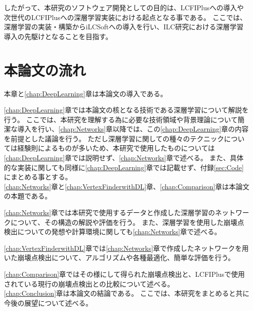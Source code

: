 したがって、本研究のソフトウェア開発としての目的は、LCFIPlusへの導入や次世代のLCFIPlusへの深層学習実装における起点となる事である。
ここでは、深層学習の実装・構築からiLCSoftへの導入を行い、ILC研究における深層学習導入の先駆けとなることを目指す。


\section{本論文の流れ} \label{Intro:Flow}

本章と\ref{chap:DeepLearning}章は本論文の導入である。

\ref{chap:DeepLearning}章では本論文の核となる技術である深層学習について解説を行う。
ここでは、本研究を理解する為に必要な技術領域や背景理論について簡潔な導入を行い、\ref{chap:Networks}章以降では、この\ref{chap:DeepLearning}章の内容を前提とした議論を行う。
ただし深層学習に関しての種々のテクニックについては経験則によるものが多いため、本研究で使用したものについては\ref{chap:DeepLearning}章では説明せず、\ref{chap:Networks}章で述べる。
また、具体的な実装に関しても同様に\ref{chap:DeepLearning}章では記載せず、付録\ref{sec:Code}にまとめる事とする。\\

\ref{chap:Networks}章と\ref{chap:VertexFinderwithDL}章、\ref{chap:Comparison}章は本論文の本題である。

\ref{chap:Networks}章では本研究で使用するデータと作成した深層学習のネットワークについて、その構造の解説や評価を行う。
また、深層学習を使用した崩壊点検出についての発想や計算環境に関しても\ref{chap:Networks}章で述べる。

\ref{chap:VertexFinderwithDL}章では\ref{chap:Networks}章で作成したネットワークを用いた崩壊点検出について、アルゴリズムや各種最適化、簡単な評価を行う。

\ref{chap:Comparison}章ではその様にして得られた崩壊点検出と、LCFIPlusで使用されている現行の崩壊点検出との比較について述べる。\\

\ref{chap:Conclusion}章は本論文の結論である。
ここでは、本研究をまとめると共に今後の展望について述べる。

















